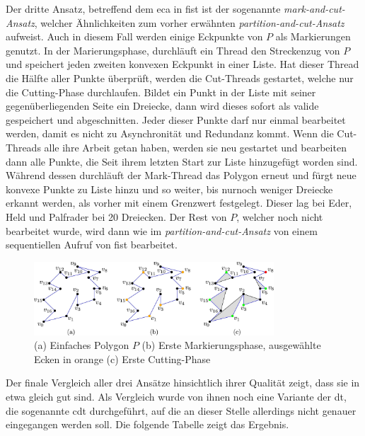 Der dritte Ansatz, betreffend dem \ac{eca} in \ac{fist} ist der sogenannte \emph{mark-and-cut-Ansatz}, welcher Ähnlichkeiten zum vorher erwähnten \emph{partition-and-cut-Ansatz} aufweist. Auch in diesem Fall werden einige Eckpunkte von $P$ als Markierungen genutzt.
In der Marierungsphase, durchläuft ein Thread den Streckenzug von $P$ und speichert jeden zweiten konvexen Eckpunkt in einer Liste. Hat dieser Thread die Hälfte aller Punkte überprüft, werden die Cut-Threads gestartet, welche nur die Cutting-Phase durchlaufen. Bildet 
ein Punkt in der Liste mit seiner gegenüberliegenden Seite ein Dreiecke, dann wird dieses sofort als valide gespeichert und abgeschnitten. Jeder dieser Punkte darf nur einmal bearbeitet werden, damit es nicht zu Asynchronität und Redundanz kommt. Wenn die Cut-Threads alle ihre Arbeit getan haben, 
werden sie neu gestartet und bearbeiten dann alle Punkte, die Seit ihrem letzten Start zur Liste hinzugefügt worden sind.
Während dessen durchläuft der Mark-Thread das Polygon erneut und fürgt neue konvexe Punkte zu Liste hinzu und so weiter, bis nurnoch weniger Dreiecke erkannt werden, als vorher mit einem Grenzwert festgelegt. Dieser lag bei Eder, Held und Palfrader bei 20 Dreiecken.
Der Rest von $P$, welcher noch nicht bearbeitet wurde, wird dann wie im \emph{partition-and-cut-Ansatz} von einem sequentiellen Aufruf von \ac{fist} bearbeitet. 

\begin{figure}[b]
    \centering
    \includegraphics[width=0.8\textwidth]{bilder/markierung.jpg}
    \caption[Markierung konvexer Eckpunkte für Parallelisierung]{\centering (a) Einfaches Polygon $P$ (b) Erste Markierungsphase, ausgewählte Ecken in orange (c) Erste Cutting-Phase}
    \label{fig:konvPoints}
\end{figure}

Der finale Vergleich aller drei Ansätze hinsichtlich ihrer Qualität zeigt, dass sie in etwa gleich gut sind. Als Vergleich wurde von ihnen noch eine Variante der \ac{dt}, die sogenannte \ac{cdt} durchgeführt, auf die an dieser Stelle allerdings nicht 
genauer eingegangen werden soll. Die folgende Tabelle zeigt das Ergebnis.

